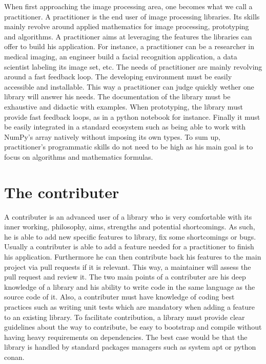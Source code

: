 When first approaching the image processing area, one becomes what we call a practitioner. A practitioner is the end
user of image processing libraries. Its skills mainly revolve around applied mathematics for image processing,
prototyping and algorithms. A practitioner aims at leveraging the features the libraries can offer to build his
application. For instance, a practitioner can be a researcher in medical imaging, an engineer build a facial recognition
application, a data scientist labeling its image set, etc. The needs of practitioner are mainly revolving around a fast
feedback loop. The developing environment must be easily accessible and installable. This way a practitioner can judge
quickly wether one library will answer his needs. The documentation of the library must be exhaustive and didactic with
examples. When prototyping, the library must provide fast feedback loops, as in a python notebook for instance. Finally
it must be easily integrated in a standard ecosystem such as being able to work with NumPy's array natively without
imposing its own types. To sum up, practitioner's programmatic skills do not need to be high as his main goal is to
focus on algorithms and mathematics formulas.


\section{The contributer}

A contributer is an advanced user of a library who is very comfortable with its inner working, philosophy, aims,
strengths and potential shortcomings. As such, he is able to add new specific features to library, fix some shortcomings
or bugs. Usually a contributer is able to add a feature needed for a practitioner to finish his application. Furthermore
he can then contribute back his features to the main project via pull requests if it is relevant. This way, a maintainer
will assess the pull request and review it. The two main points of a contributer are his deep knowledge of a library and
his ability to write code in the same language as the source code of it. Also, a contributer must have knowledge of
coding best practices such as writing unit tests which are mandatory when adding a feature to an existing library. To
facilitate contribution, a library must provide clear guidelines about the way to contribute, be easy to bootstrap and
compile without having heavy requirements on dependencies. The best case would be that the library is handled by
standard packages managers such as system apt or python conan.

